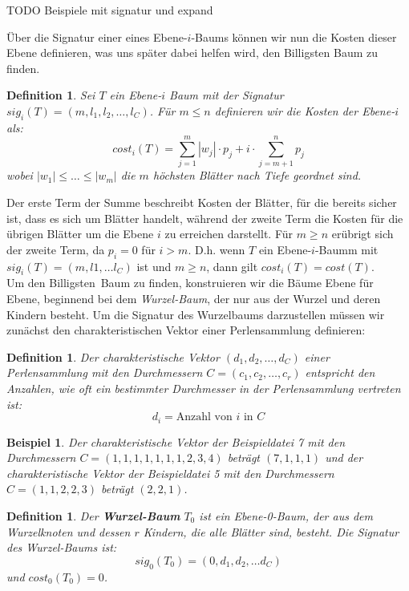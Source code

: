 \documentclass[a4paper,10pt,ngerman]{scrartcl}
\newtheorem{definition}[satz]{Definition}
\newtheorem{beispiel}[satz]{Beispiel}
\begin{document}
    TODO Beispiele mit signatur und expand

    Über die Signatur einer eines Ebene-$i$-Baums können wir nun die Kosten dieser Ebene definieren, was uns später dabei helfen wird, den \glqq Billigsten\grqq{} Baum zu finden.
    \begin{definition}
        Sei $T$ ein Ebene-$i$ Baum mit der Signatur $sig_i(T) = (m, l_1, l_2, \dots, l_C)$. Für $m \le n$ definieren wir die Kosten der Ebene-$i$ als:
        \[cost_i(T) = \sum^m_{j=1} |w_j| \cdot p_j + i \cdot \sum^n_{j=m + 1}p_j\]
        wobei $|w_1| \le \dots \le |w_m|$ die $m$ höchsten Blätter nach Tiefe geordnet sind.
    \end{definition}
    Der erste Term der Summe beschreibt Kosten der Blätter, für die bereits sicher ist, dass es sich um Blätter handelt, während der zweite Term die Kosten für die übrigen Blätter um die Ebene $i$ zu erreichen darstellt.
    Für $m \ge n$ erübrigt sich der zweite Term, da $p_i = 0$ für $i > m$. D.h. wenn $T$ ein Ebene-$i$-Baumm mit $sig_i(T) = (m, l1, \dots l_C)$ ist und $m \ge n$, dann gilt $cost_i(T) = cost(T)$. \\
    Um den \glqq Billigsten\grqq~Baum zu finden, konstruieren wir die Bäume Ebene für Ebene, beginnend bei dem \textit{Wurzel-Baum}, der nur aus der Wurzel und deren Kindern besteht.
    Um die Signatur des Wurzelbaums darzustellen müssen wir zunächst den charakteristischen Vektor einer Perlensammlung definieren:
    \begin{definition}
        Der charakteristische Vektor $(d_1, d_2, \dots, d_C)$ einer Perlensammlung mit den Durchmessern $C = (c_1, c_2, \dots, c_r)$ entspricht den Anzahlen, wie oft ein bestimmter Durchmesser in der Perlensammlung vertreten ist:
        \[d_i = \text{Anzahl von $i$ in $C$}\]
    \end{definition}
    \begin{beispiel}
        Der charakteristische Vektor der Beispieldatei 7 mit den Durchmessern $C = (1, 1, 1, 1, 1, 1, 1, 2, 3, 4)$ beträgt $(7, 1, 1, 1)$ und der charakteristische Vektor der Beispieldatei 5 mit den Durchmessern $C = (1, 1, 2, 2, 3)$ beträgt $(2, 2, 1)$.
    \end{beispiel}
    \begin{definition}
        Der \textbf{Wurzel-Baum} $T_0$ ist ein Ebene-0-Baum, der aus dem Wurzelknoten und dessen $r$ Kindern, die alle Blätter sind, besteht.
        Die Signatur des Wurzel-Baums ist: \[sig_0(T_0) = (0, d_1, d_2, \dots d_C)\] und $cost_0(T_0) = 0$.
    \end{definition} %
\end{document}
